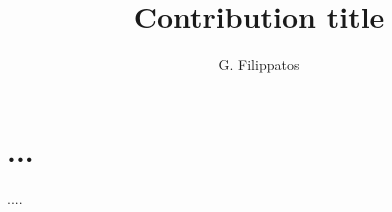 \documentclass[a4paper,11pt]{article}
\title{Contribution title}
\author*[a]{G. Filippatos}
\affiliation[a]{Colorado School of Mines, Golden, USA}
\begin{document}
\maketitle


\section{...}

\begin{thebibliography}{99}
....

\end{thebibliography}
\end{document}
